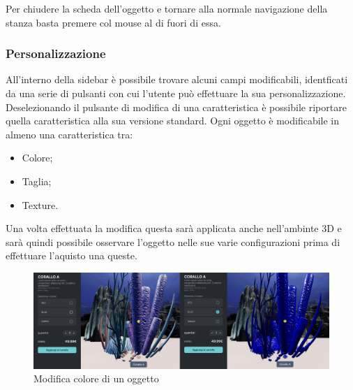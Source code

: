 Per chiudere la scheda dell'oggetto e tornare alla normale navigazione della stanza basta premere col mouse al di fuori di essa.
\subsubsection{Personalizzazione}
All'interno della sidebar è possibile trovare alcuni campi modificabili, identficati da una serie di pulsanti con cui l'utente può effettuare la sua personalizzazione.
Deselezionando il pulsante di modifica di una caratteristica è possibile riportare quella caratteristica alla sua versione standard.
Ogni oggetto è modificabile in almeno una caratteristica tra:
\begin{itemize}
	\item Colore;
	\item Taglia;
	\item Texture.
\end{itemize}
Una volta effettuata la modifica questa sarà applicata anche nell'ambinte 3D e sarà quindi possibile osservare l'oggetto nelle sue varie configurazioni prima di effettuare l'aquisto una queste.
\begin{figure}[H]
  \renewcommand{\thefigure}{5}
\begin{center}
  \includegraphics[width=\linewidth]{./res/images/modifica.png}
\end{center}
  \caption{Modifica colore di un oggetto}
  \label{Modifica colore di un oggetto}
\end{figure}
\pagebreak

